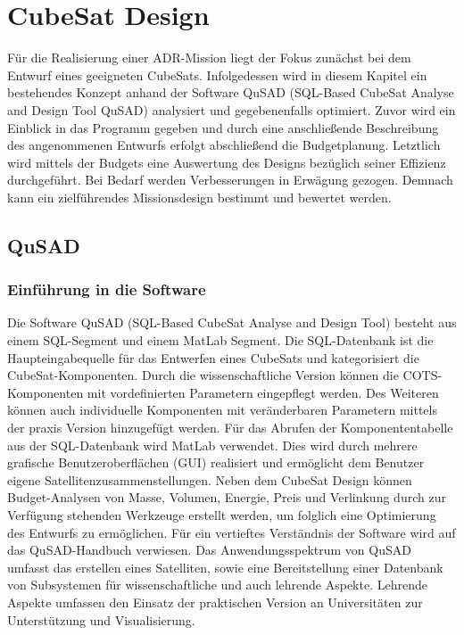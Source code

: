 \chapter{CubeSat Design}

	Für die Realisierung einer ADR-Mission liegt der Fokus zunächst bei dem Entwurf eines geeigneten CubeSats. Infolgedessen wird in diesem Kapitel ein bestehendes Konzept \cite{Lettau.} anhand der Software QuSAD (SQL-Based CubeSat Analyse and Design Tool QuSAD) analysiert und gegebenenfalls optimiert. Zuvor wird ein Einblick in das Programm gegeben und durch eine anschließende Beschreibung des angenommenen Entwurfs erfolgt abschließend die Budgetplanung. Letztlich wird mittels der Budgets eine Auswertung des Designs bezüglich seiner Effizienz durchgeführt. Bei Bedarf werden Verbesserungen in Erwägung gezogen. Demnach kann ein zielführendes Missionsdesign bestimmt und bewertet werden.
		
		\section{QuSAD}
			
			\subsection{Einführung in die Software}
			
	
	Die Software QuSAD (SQL-Based CubeSat Analyse and Design Tool) besteht aus einem SQL-Segment und einem MatLab Segment. Die SQL-Datenbank ist die Haupteingabequelle für das Entwerfen eines CubeSats und kategorisiert die CubeSat-Komponenten. Durch die wissenschaftliche Version können die COTS-Komponenten mit vordefinierten Parametern eingepflegt werden. Des Weiteren können auch individuelle Komponenten mit veränderbaren Parametern mittels der praxis Version hinzugefügt werden. Für das Abrufen der Komponententabelle aus der SQL-Datenbank wird MatLab verwendet. Dies wird durch mehrere grafische Benutzeroberflächen (GUI) realisiert und ermöglicht dem Benutzer eigene Satellitenzusammenstellungen. Neben dem CubeSat Design können Budget-Analysen von Masse, Volumen, Energie, Preis und Verlinkung durch zur Verfügung stehenden Werkzeuge erstellt werden, um folglich eine Optimierung des Entwurfs zu ermöglichen. Für ein vertieftes Verständnis der Software wird auf das QuSAD-Handbuch \cite{Farahvashi.} verwiesen. Das Anwendungsspektrum von QuSAD umfasst das erstellen eines Satelliten, sowie eine Bereitstellung einer Datenbank von Subsystemen für wissenschaftliche und auch lehrende Aspekte. Lehrende Aspekte umfassen den Einsatz der praktischen Version an Universitäten zur Unterstützung und Visualisierung. \cite{Farahvashi.b}
			
